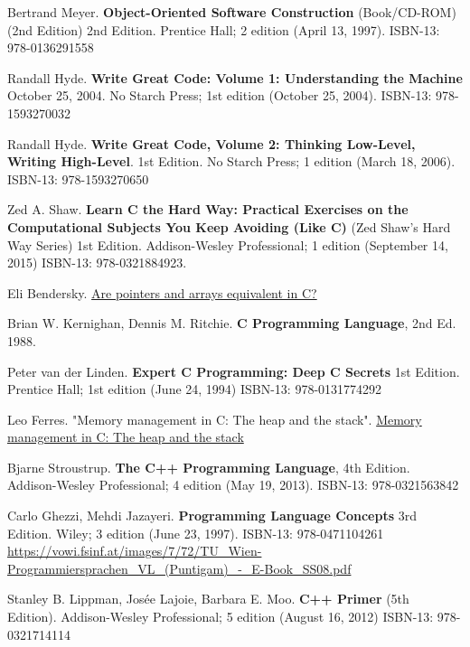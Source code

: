 \documentclass[10pt]{amsart}
\begin{document}
\begin{thebibliography}{9}
Bertrand Meyer. \textbf{Object-Oriented Software Construction} (Book/CD-ROM) (2nd Edition) 2nd Edition.   Prentice Hall; 2 edition (April 13, 1997).  ISBN-13: 978-0136291558

Randall Hyde.  \textbf{Write Great Code: Volume 1: Understanding the Machine} October 25, 2004.  No Starch Press; 1st edition (October 25, 2004).  ISBN-13: 978-1593270032

Randall Hyde.  \textbf{Write Great Code, Volume 2: Thinking Low-Level, Writing High-Level}.   1st Edition.  No Starch Press; 1 edition (March 18, 2006).  ISBN-13: 978-1593270650

Zed A. Shaw.  \textbf{Learn C the Hard Way: Practical Exercises on the Computational Subjects You Keep Avoiding (Like C)} (Zed Shaw's Hard Way Series) 1st Edition.  Addison-Wesley Professional; 1 edition (September 14, 2015) ISBN-13: 978-0321884923.  

Eli Bendersky.   \href{https://eli.thegreenplace.net/2009/10/21/are-pointers-and-arrays-equivalent-in-c}{Are pointers and arrays equivalent in C?}

Brian W. Kernighan, Dennis M. Ritchie.  \textbf{C Programming Language}, 2nd Ed. 1988.   

Peter van der Linden.  \textbf{Expert C Programming: Deep C Secrets} 1st Edition.  Prentice Hall; 1st edition (June 24, 1994)  ISBN-13: 978-0131774292

Leo Ferres.  "Memory management in C: The heap and the stack".  \href{http://www.inf.udec.cl/~leo/teoX.pdf}{Memory management in C: The heap and the stack}




Bjarne Stroustrup.  \textbf{The C++ Programming Language}, 4th Edition. Addison-Wesley Professional; 4 edition (May 19, 2013).  ISBN-13: 978-0321563842

Carlo Ghezzi, Mehdi Jazayeri.  \textbf{Programming Language Concepts} 3rd Edition.  Wiley; 3 edition (June 23, 1997).  ISBN-13: 978-0471104261  \url{https://vowi.fsinf.at/images/7/72/TU_Wien-Programmiersprachen_VL_(Puntigam)_-_E-Book_SS08.pdf}

Stanley B. Lippman, Jos\'{e}e Lajoie, Barbara E. Moo. \textbf{C++ Primer} (5th Edition).  Addison-Wesley Professional; 5 edition (August 16, 2012) ISBN-13: 978-0321714114 


\end{thebibliography}
\end{document}
